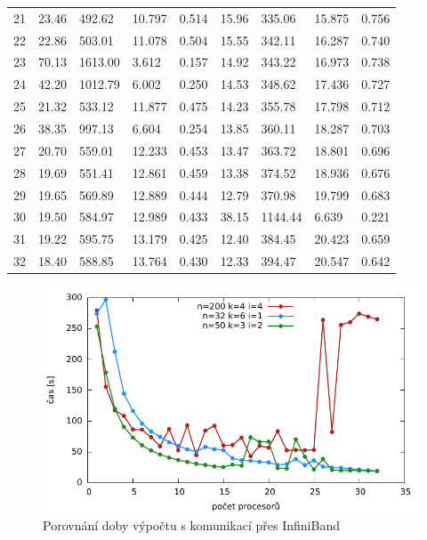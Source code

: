 \documentclass[12pt]{article}
\begin{document}
\begin{table}
\begin{tabular}{| l | l l l l | l l l l |}
21 & 23.46 & 492.62 & 10.797 & 0.514 & 15.96 & 335.06 & 15.875 & 0.756 \\
22 & 22.86 & 503.01 & 11.078 & 0.504 & 15.55 & 342.11 & 16.287 & 0.740 \\
23 & 70.13 & 1613.00 & 3.612 & 0.157 & 14.92 & 343.22 & 16.973 & 0.738 \\
24 & 42.20 & 1012.79 & 6.002 & 0.250 & 14.53 & 348.62 & 17.436 & 0.727 \\
25 & 21.32 & 533.12 & 11.877 & 0.475 & 14.23 & 355.78 & 17.798 & 0.712 \\
26 & 38.35 & 997.13 & 6.604 & 0.254 & 13.85 & 360.11 & 18.287 & 0.703 \\
27 & 20.70 & 559.01 & 12.233 & 0.453 & 13.47 & 363.72 & 18.801 & 0.696 \\
28 & 19.69 & 551.41 & 12.861 & 0.459 & 13.38 & 374.52 & 18.936 & 0.676 \\
29 & 19.65 & 569.89 & 12.889 & 0.444 & 12.79 & 370.98 & 19.799 & 0.683 \\
30 & 19.50 & 584.97 & 12.989 & 0.433 & 38.15 & 1144.44 & 6.639 & 0.221 \\
31 & 19.22 & 595.75 & 13.179 & 0.425 & 12.40 & 384.45 & 20.423 & 0.659 \\
32 & 18.40 & 588.85 & 13.764 & 0.430 & 12.33 & 394.47 & 20.547 & 0.642 \\
	\hline
\end{tabular}
\end{table}

\begin{figure}
	\caption{Porovnání doby výpočtu s komunikací přes InfiniBand}
	\includegraphics{graphs/time-ib.pdf}
\end{figure}
\end{document}
